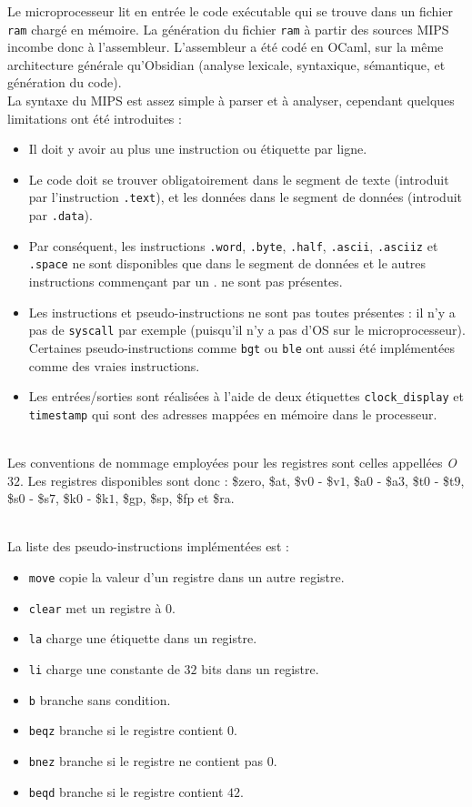 \documentclass[13pt]{article}
\begin{document}
Le microprocesseur lit en entrée le code exécutable qui se trouve dans un
fichier \texttt{ram} chargé en mémoire. La génération du fichier \texttt{ram}
à partir des sources MIPS incombe donc à l'assembleur. L'assembleur a été codé
en OCaml,
sur la même architecture générale qu'Obsidian (analyse lexicale, syntaxique,
sémantique, et génération du code). \\
La syntaxe du MIPS est assez simple à parser et à analyser, cependant quelques
limitations ont été introduites : 
\begin{itemize}
\item Il doit y avoir au plus une instruction ou étiquette par ligne.
\item Le code doit se trouver obligatoirement dans le segment de texte
  (introduit par l'instruction \texttt{.text}), et les données dans le segment de
  données (introduit par \texttt{.data}). 
\item Par conséquent, les instructions \texttt{.word}, \texttt{.byte},
  \texttt{.half}, \texttt{.ascii}, \texttt{.asciiz} et \texttt{.space} ne sont
  disponibles que dans le segment de données et le autres instructions
  commençant par un \og .\fg{} ne sont pas présentes.
\item Les instructions et pseudo-instructions ne sont pas toutes présentes :
  il n'y a pas de \texttt{syscall} par exemple (puisqu'il n'y a pas d'OS sur le
  microprocesseur). Certaines pseudo-instructions comme \texttt{bgt} ou
  \texttt{ble} ont aussi été implémentées comme des vraies instructions.
\item Les entrées/sorties sont réalisées à l'aide de deux étiquettes
  \texttt{clock\_display} et \texttt{timestamp} qui sont des adresses mappées en
  mémoire dans le processeur.
\end{itemize}
\text{}\\
Les conventions de nommage employées pour les registres sont celles appellées
\emph{O$32$}. Les registres disponibles sont donc : \$zero, \$at, \$v$0$ -
\$v$1$, \$a$0$ - \$a$3$, \$t$0$ - \$t$9$, \$s$0$ - \$s$7$, \$k$0$ - \$k$1$,
\$gp, \$sp, \$fp et \$ra.

\text{}\\
La liste des pseudo-instructions implémentées est :
\begin{itemize}
\item \texttt{move} copie la valeur d'un registre dans un autre registre.
\item \texttt{clear} met un registre à $0$.
\item \texttt{la} charge une étiquette dans un registre.
\item \texttt{li} charge une constante de $32$ bits dans un registre.
\item \texttt{b} branche sans condition.
\item \texttt{beqz} branche si le registre contient $0$.
\item \texttt{bnez} branche si le registre ne contient pas $0$.
\item \texttt{beqd} branche si le registre contient $42$.
\end{itemize}
\end{document}
